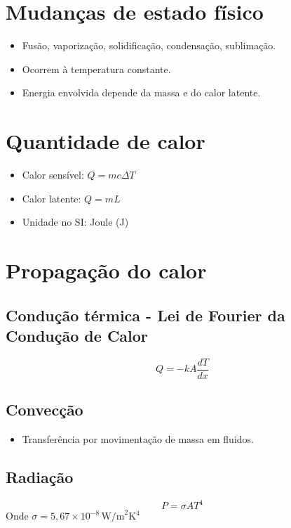 \documentclass[a4paper,12pt]{article}
\begin{document}
\begin{multicols}{2}
\section{Mudanças de estado físico}
\begin{itemize}
    \item Fusão, vaporização, solidificação, condensação, sublimação.
    \item Ocorrem à temperatura constante.
    \item Energia envolvida depende da massa e do calor latente.
\end{itemize}

\section{Quantidade de calor}
\begin{itemize}
    \item Calor sensível: $Q = mc\Delta T$
    \item Calor latente: $Q = mL$
    \item Unidade no SI: Joule (J)
\end{itemize}

\section{Propagação do calor}
\subsection{Condução térmica -  Lei de Fourier da Condução de Calor}
\begin{equation*}
\boxed{Q = -kA\frac{dT}{dx}}
\end{equation*}

\subsection{Convecção}
\begin{itemize}
    \item Transferência por movimentação de massa em fluidos.
\end{itemize}

\subsection{Radiação}
\begin{equation*}
    P = \sigma A T^4
\end{equation*}
Onde $\sigma = 5{,}67 \times 10^{-8} \, \text{W/m}^2\text{K}^4$


\end{multicols}
\end{document}
